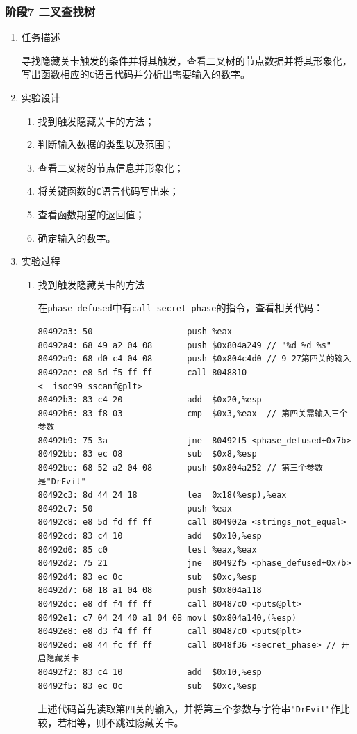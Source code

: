 \documentclass{paper}
\begin{document}
\subsubsection{阶段7 二叉查找树}
\begin{enumerate}
\item 任务描述

寻找隐藏关卡触发的条件并将其触发，查看二叉树的节点数据并将其形象化，写出函数相应的\verb|C|语言代码并分析出需要输入的数字。

\item 实验设计

\begin{enumerate}
\item 找到触发隐藏关卡的方法；
\item 判断输入数据的类型以及范围；
\item 查看二叉树的节点信息并形象化；
\item 将关键函数的\verb|C|语言代码写出来；
\item 查看函数期望的返回值；
\item 确定输入的数字。
\end{enumerate}

\item 实验过程

\begin{enumerate}
\item 找到触发隐藏关卡的方法

在\verb|phase_defused|中有\verb|call secret_phase|的指令，查看相关代码：
\begin{lstlisting}
80492a3: 50                   push %eax
80492a4: 68 49 a2 04 08       push $0x804a249 // "%d %d %s"
80492a9: 68 d0 c4 04 08       push $0x804c4d0 // 9 27第四关的输入
80492ae: e8 5d f5 ff ff       call 8048810 <__isoc99_sscanf@plt>
80492b3: 83 c4 20             add  $0x20,%esp
80492b6: 83 f8 03             cmp  $0x3,%eax  // 第四关需输入三个参数
80492b9: 75 3a                jne  80492f5 <phase_defused+0x7b>
80492bb: 83 ec 08             sub  $0x8,%esp
80492be: 68 52 a2 04 08       push $0x804a252 // 第三个参数是"DrEvil"
80492c3: 8d 44 24 18          lea  0x18(%esp),%eax
80492c7: 50                   push %eax
80492c8: e8 5d fd ff ff       call 804902a <strings_not_equal>
80492cd: 83 c4 10             add  $0x10,%esp
80492d0: 85 c0                test %eax,%eax
80492d2: 75 21                jne  80492f5 <phase_defused+0x7b>
80492d4: 83 ec 0c             sub  $0xc,%esp
80492d7: 68 18 a1 04 08       push $0x804a118
80492dc: e8 df f4 ff ff       call 80487c0 <puts@plt>
80492e1: c7 04 24 40 a1 04 08 movl $0x804a140,(%esp)
80492e8: e8 d3 f4 ff ff       call 80487c0 <puts@plt>
80492ed: e8 44 fc ff ff       call 8048f36 <secret_phase> // 开启隐藏关卡
80492f2: 83 c4 10             add  $0x10,%esp
80492f5: 83 ec 0c             sub  $0xc,%esp
\end{lstlisting}
上述代码首先读取第四关的输入，并将第三个参数与字符串\verb|"DrEvil"|作比较，若相等，则不跳过隐藏关卡。


\end{enumerate}
\end{enumerate}
\end{document}
